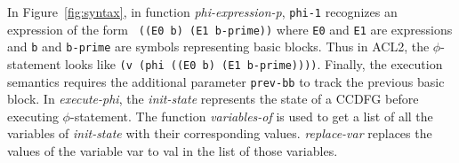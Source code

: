 

In Figure~\ref{fig:syntax}, in function {\em phi-expression-p}, {\tt phi-1} recognizes an expression of the form {\tt
  ((E0 b) (E1 b-prime))} where {\tt E0} and {\tt E1} are
expressions and {\tt b} and {\tt b-prime} are symbols
representing basic blocks.  Thus in ACL2, the
$\phi$-statement looks like {\tt (v (phi ((E0 b) (E1
  b-prime))))}.  Finally, the execution semantics requires
the additional parameter {\tt prev-bb} to track the previous
basic block. In {\em execute-phi}, the {\em init-state} represents the state of a CCDFG before executing $\phi$-statement. The function 
{\em variables-of} is used to get a list of all the variables of {\em init-state} with their corresponding values. 
{\em replace-var} replaces the values of the variable {var} to {val} in the list of those variables.

    



